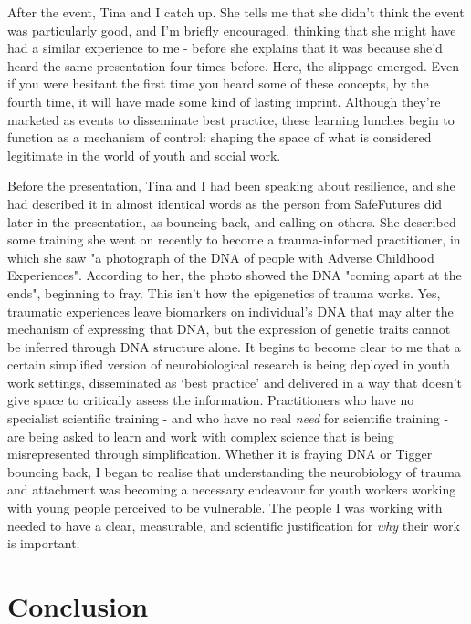 After the event, Tina and I catch up. She tells me that she didn't think the event was particularly good, and I'm briefly encouraged, thinking that she might have had a similar experience to me - before she explains that it was because she'd heard the same presentation four times before. Here, the slippage emerged. Even if you were hesitant the first time you heard some of these concepts, by the fourth time, it will have made some kind of lasting imprint. Although they're marketed as events to disseminate best practice, these learning lunches begin to function as a mechanism of control: shaping the space of what is considered legitimate in the world of youth and social work. 

Before the presentation, Tina and I had been speaking about resilience, and she had described it in almost identical words as the person from SafeFutures did later in the presentation, as bouncing back, and calling on others. She described some training she went on recently to become a trauma-informed practitioner, in which she saw "a photograph of the DNA of people with Adverse Childhood Experiences". According to her, the photo showed the DNA "coming apart at the ends", beginning to fray. This isn't how the epigenetics of trauma works. Yes, traumatic experiences leave biomarkers on individual's DNA that may alter the mechanism of expressing that DNA, but the expression of genetic traits cannot be inferred through DNA structure alone. It begins to become clear to me that a certain simplified version of neurobiological research is being deployed in youth work settings, disseminated as `best practice' and delivered in a way that doesn't give space to critically assess the information. Practitioners who have no specialist scientific training - and who have no real \textit{need} for scientific training - are being asked to learn and work with complex science that is being misrepresented through simplification. Whether it is fraying DNA or Tigger bouncing back, I began to realise that understanding the neurobiology of trauma and attachment was becoming a necessary endeavour for youth workers working with young people perceived to be vulnerable. The people I was working with needed to have a clear, measurable, and scientific justification for \textit{why} their work is important.

\section{Conclusion}

